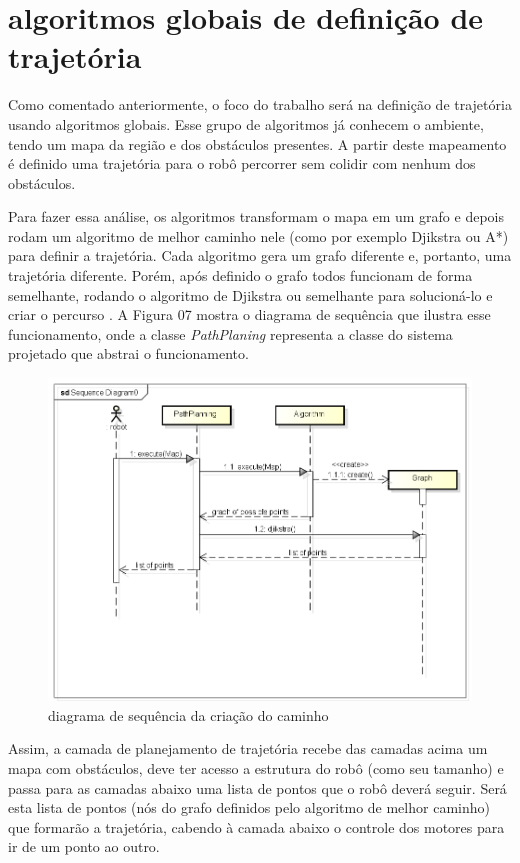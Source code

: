 \section{algoritmos globais de definição de trajetória}

Como comentado anteriormente, o foco do trabalho será na definição de trajetória usando algoritmos globais. Esse grupo de algoritmos já conhecem o ambiente, tendo um mapa da região e dos obstáculos presentes. A partir deste mapeamento é definido uma trajetória para o robô percorrer sem colidir com nenhum dos obstáculos.

Para fazer essa análise, os algoritmos transformam o mapa em um grafo e depois rodam um algoritmo de melhor caminho nele (como por exemplo Djikstra ou A*) para definir a trajetória. Cada algoritmo gera um grafo diferente e, portanto, uma trajetória diferente. Porém, após definido o grafo todos funcionam de forma semelhante, rodando o algoritmo de Djikstra ou semelhante para solucioná-lo e criar o percurso \cite{Guzman2008}. A Figura 07 mostra o diagrama de sequência que ilustra esse funcionamento, onde a classe \textit{PathPlaning} representa a classe do sistema projetado que abstrai o funcionamento.

\begin{figure}[h]
	\centering
	\label{fig07}
		\includegraphics[keepaspectratio=true,scale=0.6]{figuras/5diagramaSequencia.png}
	\caption{diagrama de sequência da criação do caminho}
\end{figure}

Assim, a camada de planejamento de trajetória recebe das camadas acima um mapa com obstáculos, deve ter acesso a estrutura do robô (como seu tamanho) e passa para as camadas abaixo uma lista de pontos que o robô deverá seguir. Será esta lista de pontos (nós do grafo definidos pelo algoritmo de melhor caminho) que formarão a trajetória, cabendo à camada abaixo o controle dos motores para ir de um ponto ao outro.

